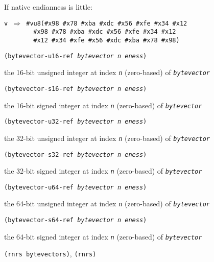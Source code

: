 If native endianness is little:


\begin{alltt}
v \(\Rightarrow\) \#{}vu8(\#{}x98 \#{}x78 \#{}xba \#{}xdc \#{}x56 \#{}xfe \#{}x34 \#{}x12
        \#{}x98 \#{}x78 \#{}xba \#{}xdc \#{}x56 \#{}xfe \#{}x34 \#{}x12
        \#{}x12 \#{}x34 \#{}xfe \#{}x56 \#{}xdc \#{}xba \#{}x78 \#{}x98)
\end{alltt}

\begin{description}

\label{objects_s256}\item[procedure] \texttt{(bytevector-u16-ref \textit{bytevector} \textit{n} \textit{eness})}



\item[returns] the 16-bit unsigned integer at index \texttt{\textit{n}} (zero-based) of \texttt{\textit{bytevector}} 


\item[procedure] \texttt{(bytevector-s16-ref \textit{bytevector} \textit{n} \textit{eness})}



\item[returns] the 16-bit signed integer at index \texttt{\textit{n}} (zero-based) of \texttt{\textit{bytevector}} 


\item[procedure] \texttt{(bytevector-u32-ref \textit{bytevector} \textit{n} \textit{eness})}



\item[returns] the 32-bit unsigned integer at index \texttt{\textit{n}} (zero-based) of \texttt{\textit{bytevector}} 


\item[procedure] \texttt{(bytevector-s32-ref \textit{bytevector} \textit{n} \textit{eness})}



\item[returns] the 32-bit signed integer at index \texttt{\textit{n}} (zero-based) of \texttt{\textit{bytevector}} 


\item[procedure] \texttt{(bytevector-u64-ref \textit{bytevector} \textit{n} \textit{eness})}



\item[returns] the 64-bit unsigned integer at index \texttt{\textit{n}} (zero-based) of \texttt{\textit{bytevector}} 


\item[procedure] \texttt{(bytevector-s64-ref \textit{bytevector} \textit{n} \textit{eness})}



\item[returns] the 64-bit signed integer at index \texttt{\textit{n}} (zero-based) of \texttt{\textit{bytevector}} 


\item[libraries] \texttt{(rnrs bytevectors)}, \texttt{(rnrs)}
\end{description}

